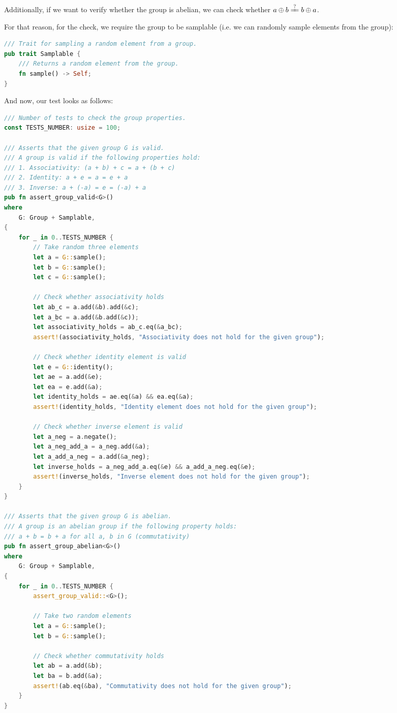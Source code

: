 \documentclass[../lecture-notes-148x210.tex]{subfiles}
\begin{document}
Additionally, if we want to verify whether the group is abelian, we can check whether $a \oplus b \xlongequal{?} b \oplus a$. 

For that reason, for the check, we require the group to be samplable (i.e. we can randomly sample elements from the group):
\begin{lstlisting}[language=Rust]
/// Trait for sampling a random element from a group.
pub trait Samplable {
    /// Returns a random element from the group.
    fn sample() -> Self;
}
\end{lstlisting}

And now, our test looks as follows:
\begin{lstlisting}[language=Rust]
/// Number of tests to check the group properties.
const TESTS_NUMBER: usize = 100;

/// Asserts that the given group G is valid.
/// A group is valid if the following properties hold:
/// 1. Associativity: (a + b) + c = a + (b + c)
/// 2. Identity: a + e = a = e + a
/// 3. Inverse: a + (-a) = e = (-a) + a
pub fn assert_group_valid<G>()
where
    G: Group + Samplable,
{
    for _ in 0..TESTS_NUMBER {
        // Take random three elements
        let a = G::sample();
        let b = G::sample();
        let c = G::sample();

        // Check whether associativity holds
        let ab_c = a.add(&b).add(&c);
        let a_bc = a.add(&b.add(&c));
        let associativity_holds = ab_c.eq(&a_bc);
        assert!(associativity_holds, "Associativity does not hold for the given group");

        // Check whether identity element is valid
        let e = G::identity();
        let ae = a.add(&e);
        let ea = e.add(&a);
        let identity_holds = ae.eq(&a) && ea.eq(&a);
        assert!(identity_holds, "Identity element does not hold for the given group");

        // Check whether inverse element is valid
        let a_neg = a.negate();
        let a_neg_add_a = a_neg.add(&a);
        let a_add_a_neg = a.add(&a_neg);
        let inverse_holds = a_neg_add_a.eq(&e) && a_add_a_neg.eq(&e);
        assert!(inverse_holds, "Inverse element does not hold for the given group");
    }
}

/// Asserts that the given group G is abelian.
/// A group is an abelian group if the following property holds:
/// a + b = b + a for all a, b in G (commutativity)
pub fn assert_group_abelian<G>()
where
    G: Group + Samplable,
{
    for _ in 0..TESTS_NUMBER {
        assert_group_valid::<G>();

        // Take two random elements
        let a = G::sample();
        let b = G::sample();

        // Check whether commutativity holds
        let ab = a.add(&b);
        let ba = b.add(&a);
        assert!(ab.eq(&ba), "Commutativity does not hold for the given group");
    }
}    
\end{lstlisting}
\end{document}
